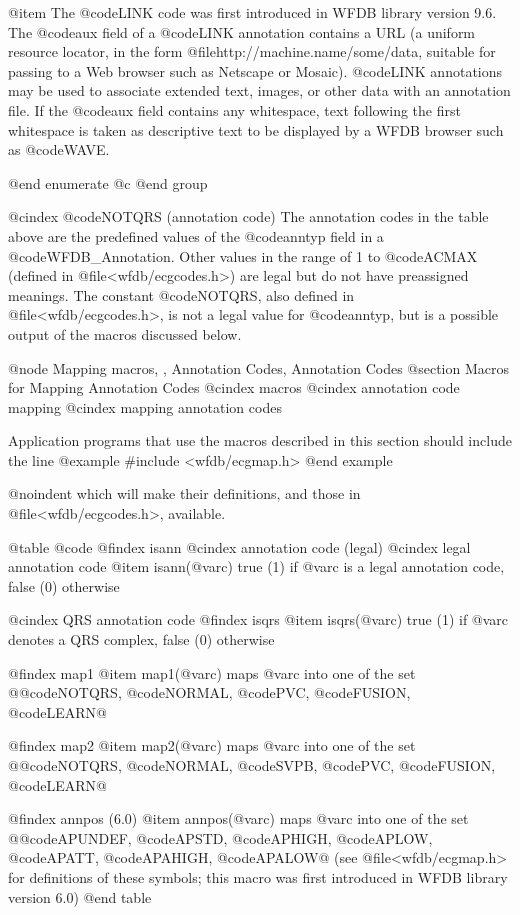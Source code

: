 {{{{{{{{{@item
The @code{LINK} code was first introduced in WFDB library version 9.6.  The
@code{aux} field of a @code{LINK} annotation contains a URL (a uniform
resource locator, in the form @file{http://machine.name/some/data},
suitable for passing to a Web browser such as Netscape or Mosaic).  @code{LINK}
annotations may be used to associate extended text, images, or other data with
an annotation file.  If the @code{aux} field contains any whitespace, text
following the first whitespace is taken as descriptive text to be displayed by
a WFDB browser such as @code{WAVE}.

@end enumerate
@c @end group

@cindex @code{NOTQRS} (annotation code)
The annotation codes in the table above are the predefined values of the
@code{anntyp} field in a @code{WFDB_Annotation}.  Other values in the range
of 1 to @code{ACMAX} (defined in @file{<wfdb/ecgcodes.h>}) are legal but
do not have preassigned meanings.  The constant @code{NOTQRS}, also defined in
@file{<wfdb/ecgcodes.h>}, is not a legal value for @code{anntyp}, but is
a possible output of the macros discussed below.

@node    Mapping macros, , Annotation Codes, Annotation Codes
@section Macros for Mapping Annotation Codes
@cindex macros
@cindex annotation code mapping
@cindex mapping annotation codes

Application programs that use the macros described in this section
should include the line
@example
#include <wfdb/ecgmap.h>
@end example

@noindent
which will make their definitions, and those in @file{<wfdb/ecgcodes.h>},
available.

@table @code
@findex isann
@cindex annotation code (legal)
@cindex legal annotation code
@item isann(@var{c})
true (1) if @var{c} is a legal annotation code, false (0)
otherwise

@cindex QRS annotation code
@findex isqrs
@item isqrs(@var{c})
true (1) if @var{c} denotes a QRS complex, false (0) otherwise

@findex map1
@item map1(@var{c})
maps @var{c} into one of the set @{@code{NOTQRS}, @code{NORMAL},
@code{PVC}, @code{FUSION}, @code{LEARN}@}

@findex map2
@item map2(@var{c})
maps @var{c} into one of the set @{@code{NOTQRS}, @code{NORMAL},
@code{SVPB}, @code{PVC}, @code{FUSION}, @code{LEARN}@}

@findex annpos (6.0)
@item annpos(@var{c})
maps @var{c} into one of the set @{@code{APUNDEF}, @code{APSTD},
@code{APHIGH}, @code{APLOW}, @code{APATT}, @code{APAHIGH},
@code{APALOW}@} (see @file{<wfdb/ecgmap.h>} for definitions of these
symbols;  this macro was first introduced in WFDB library version 6.0)
@end table

}}}}}}}}}

